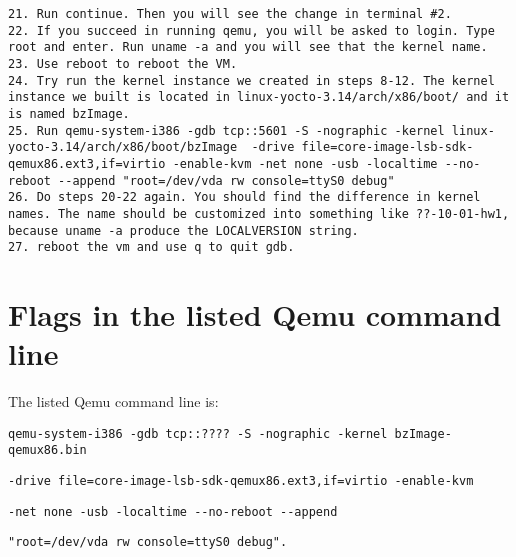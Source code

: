\documentclass[letterpaper,10pt,titlepage]{article}
\begin{document}
\begin{lstlisting}
21.	Run continue. Then you will see the change in terminal #2. 
22.	If you succeed in running qemu, you will be asked to login. Type root and enter. Run uname -a and you will see that the kernel name.
23.	Use reboot to reboot the VM.
24.	Try run the kernel instance we created in steps 8-12. The kernel instance we built is located in linux-yocto-3.14/arch/x86/boot/ and it is named bzImage.
25.	Run qemu-system-i386 -gdb tcp::5601 -S -nographic -kernel linux-yocto-3.14/arch/x86/boot/bzImage  -drive file=core-image-lsb-sdk-qemux86.ext3,if=virtio -enable-kvm -net none -usb -localtime --no-reboot --append "root=/dev/vda rw console=ttyS0 debug"
26.	Do steps 20-22 again. You should find the difference in kernel names. The name should be customized into something like ??-10-01-hw1, because uname -a produce the LOCALVERSION string.
27.	reboot the vm and use q to quit gdb.
\end{lstlisting}

\section{Flags in the listed Qemu command line}
The listed Qemu command line is:
\begin{lstlisting}
qemu-system-i386 -gdb tcp::???? -S -nographic -kernel bzImage-qemux86.bin 
\end{lstlisting}
\begin{lstlisting}
-drive file=core-image-lsb-sdk-qemux86.ext3,if=virtio -enable-kvm 
\end{lstlisting}
\begin{lstlisting}
-net none -usb -localtime --no-reboot --append 
\end{lstlisting}
\begin{lstlisting}
"root=/dev/vda rw console=ttyS0 debug".
\end{lstlisting}
\end{document}
